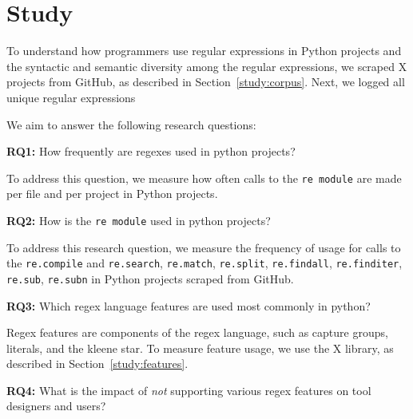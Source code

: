 \section{Study}


To understand how programmers use regular expressions in Python projects and the syntactic and semantic diversity among the regular expressions, we scraped X projects from GitHub, as described in Section~\ref{study:corpus}. Next, we logged all unique regular expressions 

We aim to answer the following research questions:

\textbf{RQ1:} How frequently are regexes used in python projects?

To address this question, we measure how often  calls to the {\tt re module} are made per file and per project in Python projects. 


\textbf{RQ2:} How is the {\tt re module} used in python projects?

To address this research question, we measure the frequency of usage for calls to the {\tt re.compile} and {\tt re.search}, {\tt re.match}, {\tt re.split}, {\tt re.findall}, {\tt re.finditer}, {\tt re.sub}, {\tt re.subn} in Python projects scraped from GitHub. 


\textbf{RQ3:} Which regex language features are used most commonly in python?

Regex features are components of the regex language, such as capture groups, literals, and the kleene star. To measure feature usage, we use the X library, as described in Section~\ref{study:features}. 

\textbf{RQ4:} What is the impact of \emph{not} supporting various regex features on tool designers and users?

